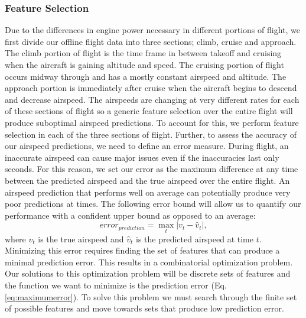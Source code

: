 \documentclass[]{aiaa-tc}
\begin{document}
\subsubsection{Feature Selection}
\label{sec:featureselection}


Due to the differences in engine power necessary in different portions of flight, we first divide our offline flight data into three sections; climb, cruise and approach. The climb portion of flight is the time frame in between takeoff and cruising when the aircraft is gaining altitude and speed. The cruising portion of flight occurs midway through and has a mostly constant airspeed and altitude. The approach portion is immediately after cruise when the aircraft begins to descend and decrease airspeed. The airspeeds are changing at very different rates for each of these sections of flight so a generic feature selection over the entire flight will produce suboptimal airspeed predictions. To account for this, we perform feature selection in each of the three sections of flight. Further, to assess the accuracy of our airspeed predictions, we need to define an error measure. During flight, an inaccurate airspeed can cause major issues even if the inaccuracies last only seconds. For this reason, we set our error as the maximum difference at any time between the predicted airspeed and the true airspeed over the entire flight. An airspeed prediction that performs well on average can potentially produce very poor predictions at times. The following error bound will allow us to quantify our performance with a confident upper bound as opposed to an average:
\begin{equation}
\label{eq:maximumerror}
error_{prediction} = \max_{t} |{v_t - \hat{v}_t}|,
\end{equation}
where $v_t$ is the true airspeed and $\hat{v}_t$ is the predicted airspeed at time $t$. Minimizing this error requires finding the set of features that can produce a minimal prediction error. This results in a combinatorial optimization problem. Our solutions to this optimization problem will be discrete sets of features and the function we want to minimize is the prediction error (Eq. \ref{eq:maximumerror}). To solve this problem we must search through the finite set of possible features and move towards sets that produce low prediction error. 
\end{document}
